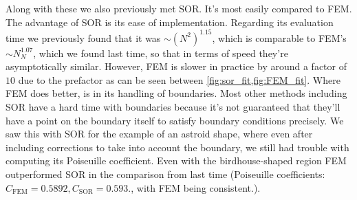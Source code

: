 \documentclass[10pt,a4paper,twocolumn]{article}
\begin{document}
Along with these we also previously met SOR. It's most easily compared to FEM. The advantage of SOR is its ease of implementation. Regarding its evaluation time we previously found that it was $\sim (N^2)^{1.15}$, which is comparable to FEM's $\sim N_N^{1.07}$, which we found last time, so that in terms of speed they're asymptotically similar. However, FEM is slower in practice by around a factor of $10$ due to the prefactor as can be seen between \cref{fig:sor_fit,fig:FEM_fit}. Where FEM does better, is in its handling of boundaries. Most other methods including SOR have a hard time with boundaries because it's not guaranteed that they'll have a point on the boundary itself to satisfy boundary conditions precisely. We saw this with SOR for the example of an astroid shape, where even after including corrections to take into account the boundary, we still had trouble with computing its Poiseuille coefficient. Even with the birdhouse-shaped region FEM outperformed SOR in the comparison from last time (Poiseuille coefficients: $C_{\mathrm{FEM}} = 0.5892, C_{\mathrm{SOR}} = 0.593.$, with FEM being consistent.).
\end{document}
